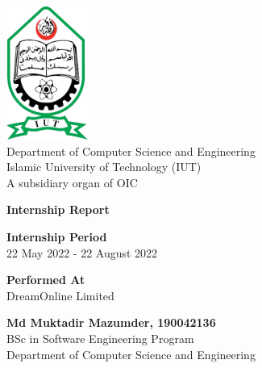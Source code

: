 
\begin{titlepage}
    \begin{center}

         \includegraphics[width=0.2\textwidth]{assets/images/universityLogo.png}
         \vspace{1cm}\\
         \LARGE
         Department of Computer Science and Engineering \\
Islamic University of Technology (IUT)\\
A subsidiary organ of OIC

          \vspace*{1.9cm}
        \huge
        \textbf{Internship Report}
        
    
        
        \vspace{1.5cm}
        \LARGE
        \textbf{Internship Period}\\
        \vspace{0.2cm}
        22 May 2022 - 22 August 2022

        \vspace{1.2cm}

    
        \textbf{Performed At}\\
        \vspace{0.1cm}
        DreamOnline Limited
        
        \vspace{3cm}
        
     
        
        \Large
       \textbf{Md Muktadir Mazumder, 190042136}\\
       \vspace{0.3cm}
        BSc in Software Engineering Program\\
        Department of Computer Science and Engineering
\\
        
        
    \end{center}
\end{titlepage}